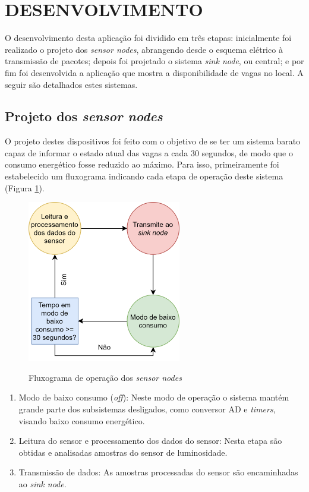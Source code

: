 \documentclass[oneside,openright,12pt]{ufsm_2015} %
\begin{document}
    
    \section{DESENVOLVIMENTO}
    O desenvolvimento desta aplicação foi dividido em três etapas: inicialmente foi realizado o projeto dos \textit{sensor nodes}, abrangendo desde o esquema elétrico à transmissão de pacotes; depois foi projetado o sistema \textit{sink node}, ou central; e por fim foi desenvolvida a aplicação que mostra a disponibilidade de vagas no local. A seguir são detalhados estes sistemas.
    
    \subsection{Projeto dos \textit{sensor nodes}}
    O projeto destes dispositivos foi feito com o objetivo de se ter um sistema barato capaz de informar o estado atual das vagas a cada 30 segundos, de modo que o consumo energético fosse reduzido ao máximo. Para isso, primeiramente foi estabelecido um fluxograma indicando cada etapa de operação deste sistema (Figura \ref{fig:flux-sensor-node}).
    
    \begin{figure}[ht]
     	    \caption{\label{exepretex} Fluxograma de operação dos \textit{sensor nodes}}
            \centering
            \includegraphics[width=0.6\textwidth]{figuras/sensor-node-fluxograma.png}
            \vspace{\baselineskip} %
                \label{fig:flux-sensor-node}
    \end{figure}
    
    \begin{enumerate}
        \item Modo de baixo consumo (\textit{off}): Neste modo de operação o sistema mantém grande parte dos subsistemas desligados, como conversor AD e \textit{timers}, visando baixo consumo energético.
        \item Leitura do sensor e processamento dos dados do sensor: Nesta etapa são obtidas e analisadas amostras do sensor de luminosidade.
        \item Transmissão de dados: As amostras processadas do sensor são encaminhadas ao \textit{sink node}.
    \end{enumerate}
    
\end{document}
